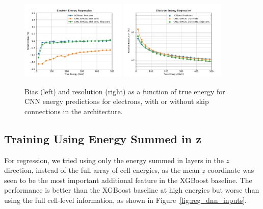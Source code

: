 \begin{figure}[htbp]
\centering
\includegraphics[width=0.45\textwidth]{Images/Calo/bias_vs_E_EleFixed_cnn_skip_zoom.pdf}
\includegraphics[width=0.45\textwidth]{Images/Calo/res_vs_E_EleFixed_cnn_skip_fits.pdf}
\caption{Bias (left) and resolution (right) as a function of true energy for CNN energy predictions for electrons, with or without skip connections in the architecture.
}
\label{fig:reg_cnn_skip}
\end{figure}

\subsection*{Training Using Energy Summed in z}

For regression, we tried using only the energy summed in layers in the $z$ direction, instead of the full array of cell energies, as the mean $z$ coordinate was seen to be the most important additional feature in the XGBoost baseline.  The performance is better than the XGBoost baseline at high energies but worse than using the full cell-level information, as shown in Figure~\ref{fig:reg_dnn_inputs}.

